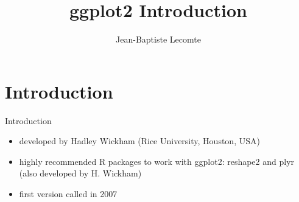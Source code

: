 \documentclass{beamer}\usepackage[]{graphicx}\usepackage[]{color}
\title{ggplot2 Introduction}
\author{Jean-Baptiste Lecomte}
\begin{document}
\maketitle


\section{Introduction}

\begin{frame}{Introduction}
\begin{itemize}
\item developed by Hadley Wickham (Rice University, Houston, USA)
\item highly recommended R packages to work with ggplot2: reshape2 and plyr (also developed by H. Wickham)
\item first version called in 2007
\end{itemize}
\end{frame}
\end{document}
